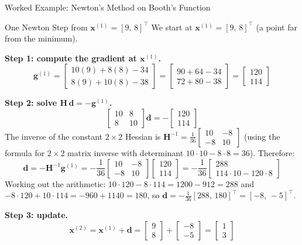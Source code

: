 \documentclass[aspectratio=169,10pt]{beamer}
\newcommand{\xbf}{\mathbf{x}}
\newcommand{\gbf}{\mathbf{g}}
\newcommand{\Hbf}{\mathbf{H}}
\begin{document}
\begin{frame}[allowframebreaks]{Worked Example: Newton's Method on Booth's Function}
  \framebreak

  \begin{block}{One Newton Step from $\xbf^{(1)} = [9,\,8]^\top$}
    We start at $\xbf^{(1)} = [9,\,8]^\top$ (a point far from the minimum).

    \textbf{Step 1: compute the gradient at $\xbf^{(1)}$.}
    \[
      \gbf^{(1)} = \begin{bmatrix}10(9)+8(8)-34\\8(9)+10(8)-38\end{bmatrix}
                = \begin{bmatrix}90+64-34\\72+80-38\end{bmatrix}
                = \begin{bmatrix}120\\114\end{bmatrix}
    \]

    \textbf{Step 2: solve $\Hbf\,\mathbf{d} = -\gbf^{(1)}$.}
    \[
      \begin{bmatrix}10&8\\8&10\end{bmatrix}\mathbf{d}
      = -\begin{bmatrix}120\\114\end{bmatrix}
    \]
    The inverse of the constant $2\times 2$ Hessian is
    $\Hbf^{-1} = \frac{1}{36}\begin{bmatrix}10&-8\\-8&10\end{bmatrix}$
    (using the formula for $2\times 2$ matrix inverse with determinant
    $10\cdot10 - 8\cdot8 = 36$).  Therefore:
    \[
      \mathbf{d} = -\Hbf^{-1}\gbf^{(1)}
                = -\frac{1}{36}\begin{bmatrix}10&-8\\-8&10\end{bmatrix}
                  \begin{bmatrix}120\\114\end{bmatrix}
                = -\frac{1}{36}\begin{bmatrix}288\\114\cdot10 - 120\cdot8\end{bmatrix}
    \]
    Working out the arithmetic:
    $10\cdot120 - 8\cdot114 = 1200-912 = 288$ and
    $-8\cdot120 + 10\cdot114 = -960+1140 = 180$, so
    $\mathbf{d} = -\frac{1}{36}[288,\,180]^\top = [-8,\,-5]^\top$.

    \textbf{Step 3: update.}
    \[
      \xbf^{(2)} = \xbf^{(1)} + \mathbf{d}
                = \begin{bmatrix}9\\8\end{bmatrix} + \begin{bmatrix}-8\\-5\end{bmatrix}
                = \begin{bmatrix}1\\3\end{bmatrix}
    \]
  \end{block}


\end{frame}
\end{document}
